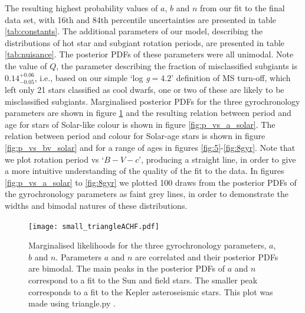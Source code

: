 \documentclass[useAMS, usenatbib]{mn2e}
\newcommand{\logg}{log \emph{g}}
\newcommand{\Q}{0.14}
\newcommand{\Qerrp}{0.06}
\newcommand{\Qerrm}{0.05}
\begin{document}
The resulting highest probability values of $a$, $b$ and $n$ from our fit to
the final data set, with 16th and 84th percentile uncertainties are
presented in table \ref{tab:constants}.
The additional parameters of our model, describing the distributions of hot
star and subgiant rotation periods, are presented in table \ref{tab:nuisance}.
The posterior PDFs of these parameters were all unimodal.
Note the value of $Q$, the parameter describing the fraction of misclassified
subgiants is $\Q^{+\Qerrp}_{-\Qerrm}$, i.e., based on our simple `\logg$=4.2$'
definition of MS turn-off, which left only 21 stars classified as cool dwarfs,
one or two of these are likely to be misclassified subgiants.
Marginalised posterior PDFs for the three gyrochronology parameters are shown
in figure \ref{fig:triangle} and the resulting relation between period and age
for stars of Solar-like colour is shown in figure \ref{fig:p_vs_a_solar}.
The relation between period and colour for Solar-age stars is shown in figure
\ref{fig:p_vs_bv_solar} and for a range of ages in figures
\ref{fig:5}-\ref{fig:8gyr}.
Note that we plot rotation period vs `$B-V-c$', producing a straight line, in
order to give a more intuitive understanding of the quality of the fit to the
data.
In figures \ref{fig:p_vs_a_solar} to \ref{fig:8gyr} we plotted 100 draws from
the posterior PDFs of the gyrochronology parameters as faint grey lines,
in order to demonstrate the widths and bimodal natures of these distributions.

\begin{figure}
\begin{center}
\texttt{[image: small\_triangleACHF.pdf]}
\caption{Marginalised likelihoods for the three gyrochronology
parameters, $a$, $b$ and $n$. Parameters $a$ and $n$ are correlated and their
posterior PDFs are bimodal. The main peaks in the posterior PDFs of $a$ and
$n$ correspond to a fit to the Sun and field stars. The smaller peak
corresponds to a fit to the Kepler asteroseismic stars.
This plot was made using triangle.py
\citep{Foreman-Mackey_triangle}.
\label{fig:triangle}}
\end{center}
\end{figure}
\end{document}
